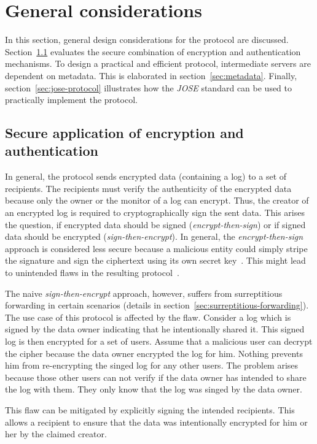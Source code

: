\documentclass[../main.tex]{subfiles}
\begin{document}
\section{General considerations}
\label{sec:protocol-considerations}
In this section, general design considerations for the protocol are discussed.
Section~\ref{sec:sign-and-encrypt} evaluates the secure combination of encryption and authentication mechanisms.
To design a practical and efficient protocol, intermediate servers are dependent on metadata.
This is elaborated in section~\ref{sec:metadata}.
Finally, section~\ref{sec:jose-protocol} illustrates how the \textit{JOSE} standard can be used to practically implement the protocol.

\subsection{Secure application of encryption and authentication}
\label{sec:sign-and-encrypt}
In general, the protocol sends encrypted data (containing a log) to a set of recipients.
The recipients must verify the authenticity of the encrypted data because only the owner or the monitor of a log can encrypt.
Thus, the creator of an encrypted log is required to cryptographically sign the sent data.
This arises the question, if encrypted data should be signed (\textit{encrypt-then-sign}) or if signed data should be encrypted (\textit{sign-then-encrypt}).
In general, the \textit{encrypt-then-sign} approach is considered less secure because a malicious entity could simply stripe the signature and sign the ciphertext using its own secret key~\cite{Davis2001}.
This might lead to unintended flaws in the resulting protocol~\cite[section~11.2]{Jones2015a}.

The naive \textit{sign-then-encrypt} approach, however, suffers from surreptitious forwarding in certain scenarios (details in section~\ref{sec:surreptitious-forwarding}).
The use case of this protocol is affected by the flaw.
Consider a log which is signed by the data owner indicating that he intentionally shared it.
This signed log is then encrypted for a set of users.
Assume that a malicious user can decrypt the cipher because the data owner encrypted the log for him.
Nothing prevents him from re-encrypting the singed log for any other users.
The problem arises because those other users can not verify if the data owner has intended to share the log with them.
They only know that the log was singed by the data owner.

This flaw can be mitigated by explicitly signing the intended recipients.
This allows a recipient to ensure that the data was intentionally encrypted for him or her by the claimed creator.~\cite{Davis2001}
\end{document}
